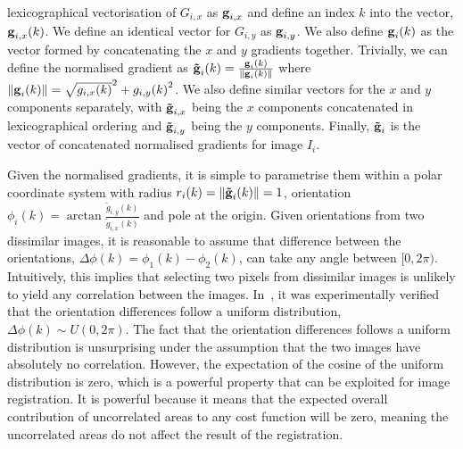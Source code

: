 lexicographical vectorisation of $G_{i,x}$ as $\boldsymbol{\mathbf{g}}_{i,x}$ and define an
index $k$ into the vector, $\boldsymbol{\mathbf{g}}_{i,x}(k)$. We define an identical vector
for $G_{i,y}$ as $\boldsymbol{\mathbf{g}}_{i,y}$. We also define $\boldsymbol{\mathbf{g}}_{i}(k)$ as the
vector formed by concatenating the $x$ and $y$ gradients together. Trivially, we
can define the normalised gradient as $\boldsymbol{\mathbf{\tilde{g}}}_{i}(k) =
\frac{\boldsymbol{\mathbf{g}}_{i}(k)}{\lVert{} \boldsymbol{\mathbf{g}}_{i}(k) \rVert}$ where
$\lVert{} \boldsymbol{\mathbf{g}}_{i}(k) \rVert = {\sqrt{g_{i,x}(k)}^2 + {g_{i,y}(k)}^2}$.  We also define
similar vectors for the $x$ and $y$ components separately, with
$\boldsymbol{\mathbf{\tilde{g}}}_{i,x}$ being the $x$ components concatenated in
lexicographical ordering and $\boldsymbol{\mathbf{\tilde{g}}}_{i,y}$ being the $y$ components.
Finally, $\boldsymbol{\mathbf{\tilde{g}}}_{i}$ is the vector of concatenated normalised
gradients for image $I_i$.

Given the normalised gradients, it is simple to parametrise them within a polar
coordinate system with radius $r_i(k) = \lVert \boldsymbol{\mathbf{\tilde{g}}}_{i}(k) \rVert
= 1$, orientation $\phi_i(k) =
\arctan{\frac{\tilde{g}_{i,y}(k)}{\tilde{g}_{i,x}(k)}}$ and pole at the origin.
Given orientations from two dissimilar images, it is reasonable to assume that
difference between the orientations, $\Delta \phi(k) = \phi_1(k) - \phi_2(k)$,
can take any angle between $[0, 2\pi)$. Intuitively, this implies that selecting
two pixels from dissimilar images is unlikely to yield any correlation between
the images. In~\cite{RefWorks:6}, it was experimentally verified that the
orientation differences follow a uniform distribution, $\Delta \phi(k) \sim U(0,
2\pi)$. The fact that the orientation differences follows a uniform distribution
is unsurprising under the assumption that the two images have absolutely no
correlation. However, the expectation of the cosine of the uniform distribution
is zero, which is a powerful property that can be exploited for image
registration. It is powerful because it means that the expected overall
contribution of uncorrelated areas to any cost function will be zero, meaning
the uncorrelated areas do not affect the result of the registration.

